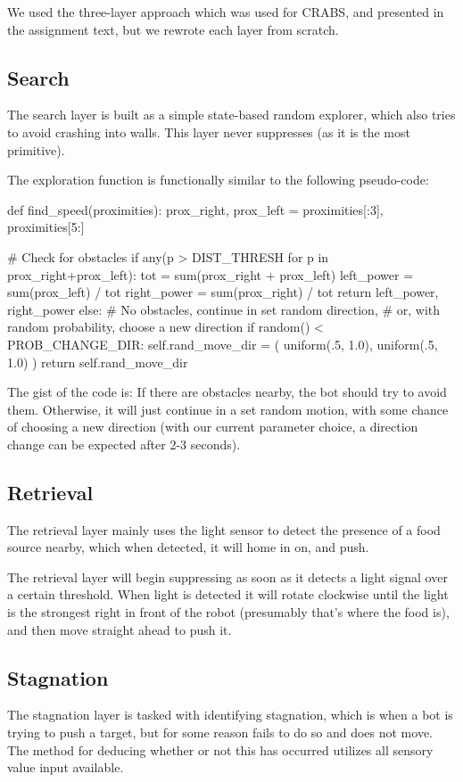 \documentclass[a4paper,10pt]{article}
\begin{document}
We used the three-layer approach which was used for CRABS, and presented in
the assignment text, but we rewrote each layer from scratch.

\subsection{Search}
The search layer is built as a simple state-based random explorer, which also
tries to avoid crashing into walls.  This layer never suppresses (as it is the
most primitive). 

The exploration function is functionally similar to the following pseudo-code:

\begin{python}
def find_speed(proximities):
    prox_right, prox_left = proximities[:3], proximities[5:]

    # Check for obstacles
    if any(p > DIST_THRESH for p in prox_right+prox_left):
        tot         = sum(prox_right + prox_left)
        left_power  = sum(prox_left)  / tot
        right_power = sum(prox_right) / tot
        return left_power, right_power
    else:
        # No obstacles, continue in set random direction,
        # or, with random probability, choose a new direction
        if random() < PROB_CHANGE_DIR:
            self.rand_move_dir = (
                uniform(.5, 1.0), 
                uniform(.5, 1.0)
            )
        return self.rand_move_dir
\end{python}

The gist of the code is: If there are obstacles nearby, the bot should try
to avoid them. Otherwise, it will just continue in a set random motion, with
some chance of choosing a new direction (with our current parameter choice, a
direction change can be expected after 2-3 seconds). 

\subsection{Retrieval}
The retrieval layer mainly uses the light sensor to detect the presence of a
food source nearby, which when detected, it will home in on, and push.

The retrieval layer will begin suppressing as soon as it detects a light
signal over a certain threshold. When light is detected it will rotate clockwise until 
the light is the strongest right in front of the robot (presumably that's where 
the food is), and then move straight ahead to push it.

\subsection{Stagnation}
The stagnation layer is tasked with identifying stagnation, which is when a 
bot is trying to push a target, but for some reason fails to do so and does 
not move. The method for deducing whether or not this has occurred utilizes 
all sensory value input available.
\end{document}
